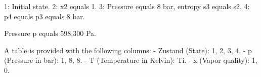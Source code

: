 1: Initial state.  
2: x2 equals 1.  
3: Pressure equals 8 bar, entropy s3 equals s2.  
4: p4 equals p3 equals 8 bar.  

Pressure p equals 598,300 Pa.  

A table is provided with the following columns:  
- Zustand (State): 1, 2, 3, 4.  
- p (Pressure in bar): 1, 8, 8.  
- T (Temperature in Kelvin): Ti.  
- x (Vapor quality): 1, 0.